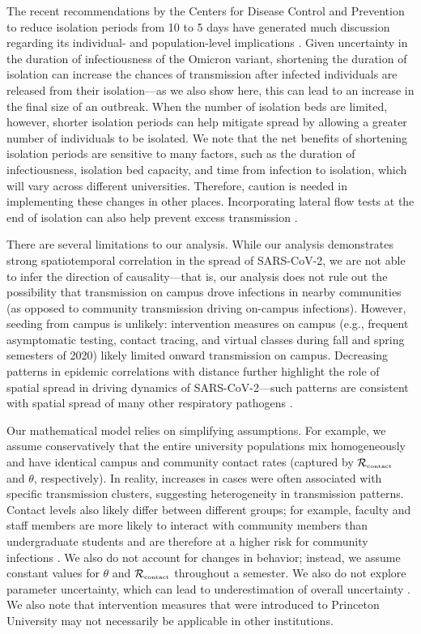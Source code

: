 \documentclass[12pt]{article}
\newcommand{\Rx}[1]{\ensuremath{{\mathcal R}_{#1}}}
\newcommand{\Rc}{\Rx{\textrm{\tiny{contact}}}}
\begin{document}
The recent recommendations by the Centers for Disease Control and Prevention to reduce isolation periods from 10 to 5 days \citep{cdcisolation} have generated much discussion regarding its individual- and population-level implications \citep{soljak2022reducing}.
Given uncertainty in the duration of infectiousness of the Omicron variant, shortening the duration of isolation can increase the chances of transmission after infected individuals are released from their isolation---as we also show here, this can lead to an increase in the final size of an outbreak.
When the number of isolation beds are limited, however, shorter isolation periods can help mitigate spread by allowing a greater number of individuals to be isolated.
We note that the net benefits of shortening isolation periods are sensitive to many factors, such as the duration of infectiousness, isolation bed capacity, and time from infection to isolation, which will vary across different universities.
Therefore, caution is needed in implementing these changes in other places.
Incorporating lateral flow tests at the end of isolation can also help prevent excess transmission \citep{quilty2022test}.

There are several limitations to our analysis.
While our analysis demonstrates strong spatiotemporal correlation in the spread of SARS-CoV-2, we are not able to infer the direction of causality---that is, our analysis does not rule out the possibility that transmission on campus drove infections in nearby communities (as opposed to community transmission driving on-campus infections).
However, seeding from campus is unlikely: 
intervention measures on campus (e.g., frequent asymptomatic testing, contact tracing, and virtual classes during fall and spring semesters of 2020) likely limited onward transmission on campus.
Decreasing patterns in epidemic correlations with distance further highlight the role of spatial spread in driving dynamics of SARS-CoV-2---such patterns are consistent with spatial spread of many other respiratory pathogens \citep{grenfell2001travelling, viboud2006synchrony, baker2019epidemic}.

Our mathematical model relies on simplifying assumptions.
For example, we assume conservatively that the entire university populations mix homogeneously and have identical campus and community contact rates (captured by $\Rc$ and $\theta$, respectively).
In reality, increases in cases were often associated with specific transmission clusters, suggesting heterogeneity in transmission patterns.
Contact levels also likely differ between different groups;
for example, faculty and staff members are more likely to interact with community members than undergraduate students and are therefore at a higher risk for community infections \citep{frazier2022modeling}.
We also do not account for changes in behavior; 
instead, we assume constant values for $\theta$ and $\Rc$ throughout a semester.
We also do not explore parameter uncertainty, which can lead to underestimation of overall uncertainty \citep{elderd2006uncertainty}. 
We also note that intervention measures that were introduced to Princeton University may not necessarily be applicable in other institutions.
\end{document}
